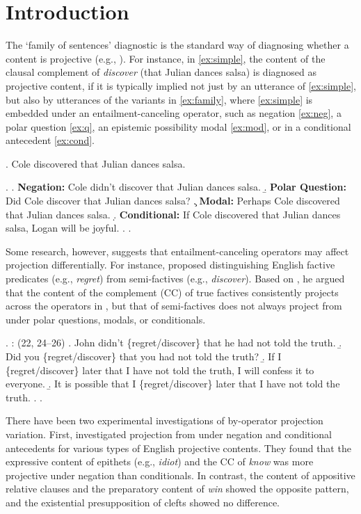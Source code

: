 \documentclass[a4paper,12pt,twoside]{article}
\begin{document}
\section{Introduction} \label{sec:intro}
    The `family of sentences' diagnostic is the standard way of diagnosing whether a content is projective (e.g., \citealt{chierchia_meaning_1990}). For instance, in \ref{ex:simple}, the content of the clausal complement of \emph{discover} (that Julian dances salsa) is diagnosed as projective content, if it is typically implied not just by an utterance of \ref{ex:simple}, but also by utterances of the variants in \ref{ex:family}, where \ref{ex:simple} is embedded under an entailment-canceling operator, such as negation \ref{ex:neg}, a polar question \ref{ex:q}, an epistemic possibility modal \ref{ex:mod}, or in a conditional antecedent \ref{ex:cond}.

    \ex.\label{ex:simple} Cole discovered that Julian dances salsa.

	\ex. \label{ex:family}
		\a. \label{ex:neg}
			{\bf Negation:} \hfill
			Cole didn't discover that Julian dances salsa.
		\b. \label{ex:q}
			{\bf Polar Question:} \hfill
			Did Cole discover that Julian dances salsa?
		\c. \label{ex:mod}
			{\bf Modal:} \hfill
			Perhaps Cole discovered that Julian dances salsa.
		\d. \label{ex:cond}
			{\bf Conditional:} \hfill
			If Cole discovered that Julian dances salsa, Logan will be joyful.
		\z.
	\z.

    Some research, however, suggests that entailment-canceling operators may affect projection differentially. For instance, \citet{karttunen_observations_1971} proposed distinguishing English factive predicates (e.g., \textit{regret}) from semi-factives (e.g., \textit{discover}). Based on \Next, he argued that the content of the complement (CC) of true factives consistently projects across the operators in \Last, but that of semi-factives does not always project from under polar questions, modals, or conditionals.%

    \ex. \citealt{karttunen_observations_1971}: (22, 24--26)
        \a. John didn't \{regret/discover\} that he had not told the truth.
        \b. Did you \{regret/discover\} that you had not told the truth?
        \b. If I \{regret/discover\} later that I have not told the truth, I will confess it to everyone.
        \b. It is possible that I \{regret/discover\} later that I have not told the truth.
        \z.
    \z.

    There have been two experimental investigations of by-operator projection variation. First, \citet{smith_relationship_2014} investigated projection from under negation and conditional antecedents for various types of English projective contents. They found that the expressive content of epithets (e.g., \textit{idiot}) and the CC of \textit{know} was more projective under negation than conditionals. In contrast, the content of appositive relative clauses and the preparatory content of \textit{win} showed the opposite pattern, and the existential presupposition of clefts showed no difference.
    
\end{document}
